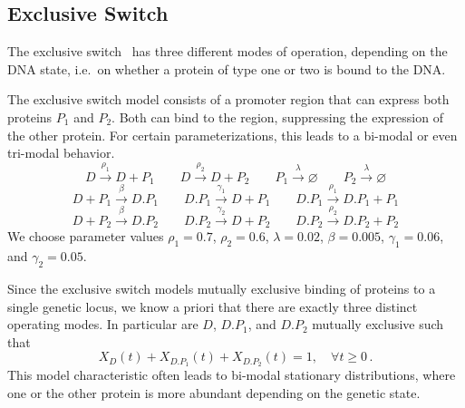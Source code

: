 \subsection{Exclusive Switch}
The exclusive switch~\parencite{barzel2008calculation}  has three different modes of operation, depending on the
DNA state, i.e.\ on whether a protein of type one or two is bound to
the DNA.

\begin{model}\label{model:excl_switch}
The exclusive switch model consists of a promoter region
that can express both proteins $P_1$ and $P_2$. Both can bind to the region, suppressing
the expression of the other protein. For certain parameterizations, this leads to a
bi-modal or even tri-modal behavior.
$$ D \xrightarrow{\rho_1} D + P_1 \qquad D \xrightarrow{\rho_2} D + P_2 \qquad P_1 \xrightarrow{\lambda}\varnothing \qquad P_2 \xrightarrow{\lambda} \varnothing $$
$$ D + P_1 \xrightarrow{\beta} D.P_1 \qquad D.P_1 \xrightarrow{\gamma_1} D + P_1 \qquad D.P_1 \xrightarrow{\rho_1} D.P_1 + P_1 $$
$$ D + P_2 \xrightarrow{\beta} D.P_2 \qquad D.P_2 \xrightarrow{\gamma_2} D + P_2 \qquad D.P_2 \xrightarrow{\rho_2} D.P_2 + P_2 $$
We choose parameter values $\rho_1 = 0.7$, $\rho_2 = 0.6$, $\lambda=0.02$, $\beta=0.005$, $\gamma_1 = 0.06$, and $\gamma_2 = 0.05$.
\end{model}
Since the exclusive switch models mutually exclusive binding of proteins to a single genetic locus,
we know a priori that there are exactly three distinct operating modes.
In particular are $D$, $D.P_1$, and $D.P_2$ mutually exclusive such that \[X_{D}(t) + X_{D.P_1}(t) + X_{D.P_2}(t) = 1, \quad \forall t\geq 0\,.\]
This model characteristic often leads to bi-modal stationary distributions, where one or the other protein is more abundant depending on the genetic state.

